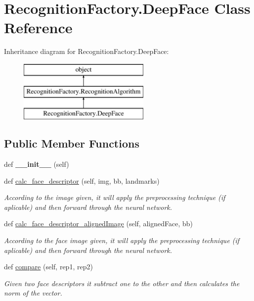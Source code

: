 \hypertarget{classRecognitionFactory_1_1DeepFace}{}\section{Recognition\+Factory.\+Deep\+Face Class Reference}
\label{classRecognitionFactory_1_1DeepFace}
Inheritance diagram for Recognition\+Factory.\+Deep\+Face\+:\begin{figure}[H]
\begin{center}
\leavevmode
\includegraphics[height=3.000000cm]{classRecognitionFactory_1_1DeepFace}
\end{center}
\end{figure}
\subsection*{Public Member Functions}
\begin{DoxyCompactItemize}
\item 
def {\bfseries \+\_\+\+\_\+init\+\_\+\+\_\+} (self)\hypertarget{classRecognitionFactory_1_1DeepFace_a4c39221f616ceccabdee5fa30b1f1675}{}\label{classRecognitionFactory_1_1DeepFace_a4c39221f616ceccabdee5fa30b1f1675}

\item 
def \hyperlink{classRecognitionFactory_1_1DeepFace_a3f25f9fffd3f0781d4c0ec3105b500c9}{calc\+\_\+face\+\_\+descriptor} (self, img, bb, landmarks)
\begin{DoxyCompactList}\small\item\em According to the image given, it will apply the preprocessing technique (if aplicable) and then forward through the neural network. \end{DoxyCompactList}\item 
def \hyperlink{classRecognitionFactory_1_1DeepFace_ac46fdf7ec084a68ab7b440b58b0efa1d}{calc\+\_\+face\+\_\+descriptor\+\_\+aligned\+Image} (self, aligned\+Face, bb)
\begin{DoxyCompactList}\small\item\em According to the face image given, it will apply the preprocessing technique (if aplicable) and then forward through the neural network. \end{DoxyCompactList}\item 
def \hyperlink{classRecognitionFactory_1_1DeepFace_a71489c980fcab54725c11191d79673fe}{compare} (self, rep1, rep2)
\begin{DoxyCompactList}\small\item\em Given two face descriptors it subtract one to the other and then calculates the norm of the vector. \end{DoxyCompactList}\end{DoxyCompactItemize}
